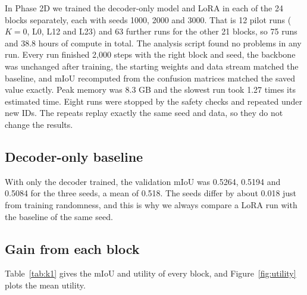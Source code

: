 \documentclass[11pt,a4paper]{report}
\begin{document}
In Phase 2D we trained the decoder-only model and LoRA in each of the 24 blocks separately, each with seeds 1000, 2000 and 3000. That is 12 pilot runs ($K = 0$, L0, L12 and L23) and 63 further runs for the other 21 blocks, so 75 runs and 38.8 hours of compute in total. The analysis script found no problems in any run. Every run finished 2,000 steps with the right block and seed, the backbone was unchanged after training, the starting weights and data stream matched the baseline, and mIoU recomputed from the confusion matrices matched the saved value exactly. Peak memory was 8.3 GB and the slowest run took 1.27 times its estimated time. Eight runs were stopped by the safety checks and repeated under new IDs. The repeats replay exactly the same seed and data, so they do not change the results.

\subsection{Decoder-only baseline}

With only the decoder trained, the validation mIoU was 0.5264, 0.5194 and 0.5084 for the three seeds, a mean of 0.518. The seeds differ by about 0.018 just from training randomness, and this is why we always compare a LoRA run with the baseline of the same seed.

\subsection{Gain from each block}

Table~\ref{tab:k1} gives the mIoU and utility of every block, and Figure~\ref{fig:utility} plots the mean utility.
\end{document}
